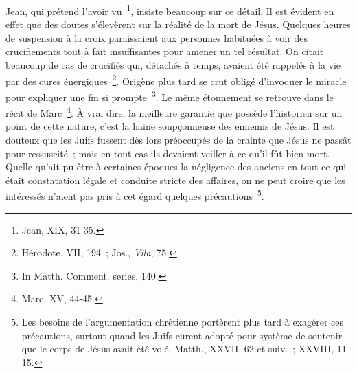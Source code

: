 \documentclass[french,twoside]{book} %
\begin{document}
Jean, qui prétend l’avoir vu \footnote{Jean, XIX, 31-35.}, insiste beaucoup sur ce détail. Il est évident en effet que des doutes s’élevèrent sur la réalité de la mort de Jésus. Quelques heures de suspension à la croix paraissaient aux personnes habituées à voir des crucifiements tout à fait insuffisantes pour amener un tel résultat. On citait beaucoup de cas de crucifiés qui, détachés à temps, avaient été rappelés à la vie par des cures énergiques \footnote{ Hérodote, VII, 194 ; Jos., {\itshape Vila}, 75.}. Origène plus tard se crut obligé d’invoquer le miracle pour expliquer une fin si prompte \footnote{In Matth. Comment. series, 140.}. Le même étonnement se retrouve dans le récit de Marc \footnote{Marc, XV, 44-45.}. À vrai dire, la meilleure garantie que possède l’historien sur un point de cette nature, c’est la haine soupçonneuse des ennemis de Jésus. Il est douteux que les Juifs fussent dès lors préoccupés de la crainte que Jésus ne passât pour ressuscité ; mais en tout cas ils devaient veiller à ce qu’il fût bien mort. Quelle qu’ait pu être à certaines époques la négligence des anciens en tout ce qui était constatation légale et conduite stricte des affaires, on ne peut croire que les intéressés n’aient pas pris à cet égard quelques précautions \footnote{Les besoins de l’argumentation chrétienne portèrent plus tard à exagérer ces précautions, surtout quand les Juifs eurent adopté pour système de soutenir que le corps de Jésus avait été volé. Matth., XXVII, 62 et suiv. ; XXVIII, 11-15.}.\par
\end{document}
